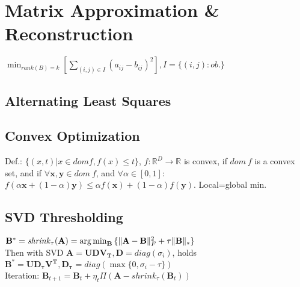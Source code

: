 \section{Matrix Approximation \& Reconstruction}

$\min_{rank(B)=k}[\sum_{(i,j)\in I}{(a_{ij}-b_{ij})^2}], I=\{(i,j): \mathit{ob.}\}$
\subsection*{Alternating Least Squares}
\vspace{20mm}

\subsection*{Convex Optimization}
Def.: $\{(x,t)|x \in dom f, f(x) \leq t\}$, $f : \mathbb{R}^D \rightarrow \mathbb{R}$ is convex, if $dom\ f$ is a convex set, and if $\forall \mathbf{x}, \mathbf{y} \in dom\ f$, and $\forall \alpha\in[0,1]$: $f(\alpha \mathbf{x} + (1 - \alpha)\mathbf{y}) \leq \alpha f(\mathbf{x}) + (1-\alpha)f(\mathbf{y})$. Local=global min.

\subsection*{SVD Thresholding}
$\mathbf{B}^{*}=\mathit{shrink}_\tau(\mathbf{A})=\operatorname*{arg\,min}_{\mathbf{B}}{\{\|\mathbf{A-B}\|^2_F + \tau\|\mathbf{B}\|_{*}\}}$\\
Then with SVD $\mathbf{A=UDV_T}, \mathbf{D}=\mathit{diag}(\sigma_i)$, holds $\mathbf{B^*=UD_\tau V^T, D_\tau} = \mathit{diag}(\max\{0,\sigma_i - \tau\})$ \\
Iteration: $\mathbf{B}_{t+1}=\mathbf{B}_t + \eta_t \Pi(\mathbf{A} - \mathit{shrink}_\tau(\mathbf{B}_t))$
